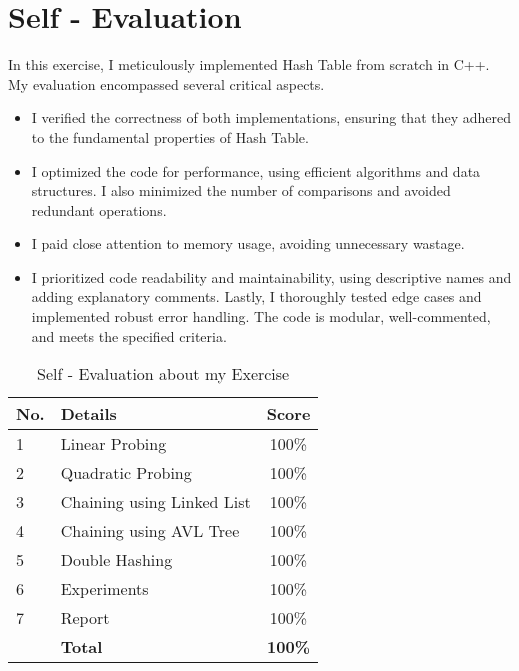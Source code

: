 \section{Self - Evaluation}
In this exercise, I meticulously implemented Hash Table from scratch in C++. My evaluation encompassed several critical aspects.
\begin{itemize}
    \item I verified the correctness of both implementations, ensuring that they adhered to the fundamental properties of Hash Table.
    \item I optimized the code for performance, using efficient algorithms and data structures. I also minimized the number of comparisons and avoided redundant operations.
    \item I paid close attention to memory usage, avoiding unnecessary wastage.
    \item I prioritized code readability and maintainability, using descriptive names and adding explanatory comments. Lastly, I thoroughly tested edge cases and implemented robust error handling. The code is modular, well-commented, and meets the specified criteria.
\end{itemize}

\begin{center}
    \begin{table}[H]
        \centering
        \caption{Self - Evaluation about my Exercise}
        \renewcommand{\arraystretch}{1.4}
        \begin{tabular}{|l|p{}|c|}
            \hline
            \textbf{No.} & \textbf{Details}           & \textbf{Score} \\ \hline
            1            & Linear Probing             & 100\%          \\ \hline
            2            & Quadratic Probing          & 100\%          \\ \hline
            3            & Chaining using Linked List & 100\%          \\ \hline
            4            & Chaining using AVL Tree    & 100\%          \\ \hline
            5            & Double Hashing             & 100\%          \\ \hline
            6            & Experiments                & 100\%          \\ \hline
            7            & Report                     & 100\%          \\ \hline
                         & \textbf{Total}             & \textbf{100\%} \\ \hline
        \end{tabular}
        \label{tab:mytable}
    \end{table}

\end{center}

